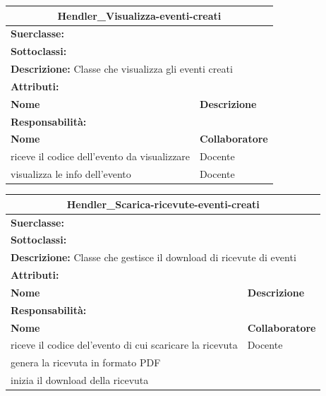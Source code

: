 \documentclass[11pt]{article}
\begin{document}
\begin{table}[H]
\centering
\begin{tabularx}{1\textwidth}{|X|X|}\hline
\multicolumn{2}{|c|}{\textbf{Hendler\_Visualizza-eventi-creati}}\\\hline
\multicolumn{2}{|l|}{\textbf{Suerclasse:}}\\\hline
\multicolumn{2}{|l|}{\textbf{Sottoclassi:}}\\\hline
\multicolumn{2}{|l|}{\textbf{Descrizione:} Classe che visualizza gli eventi creati}\\\hline
\multicolumn{2}{|l|}{\textbf{Attributi:}}\\
\textbf{Nome} & \textbf{Descrizione}\\
\hline
\multicolumn{2}{|l|}{\textbf{Responsabilità:}}\\
\textbf{Nome} & \textbf{Collaboratore}\\
riceve il codice dell'evento da visualizzare & Docente\\
visualizza le info dell'evento & Docente\\
\hline
\end{tabularx}
\end{table}


\begin{table}[H]
\centering
\begin{tabularx}{1\textwidth}{|X|X|}\hline
\multicolumn{2}{|c|}{\textbf{Hendler\_Scarica-ricevute-eventi-creati}}\\\hline
\multicolumn{2}{|l|}{\textbf{Suerclasse:}}\\\hline
\multicolumn{2}{|l|}{\textbf{Sottoclassi:}}\\\hline
\multicolumn{2}{|l|}{\textbf{Descrizione:} Classe che gestisce il download di ricevute di eventi}\\\hline
\multicolumn{2}{|l|}{\textbf{Attributi:}}\\
\textbf{Nome} & \textbf{Descrizione}\\
\hline
\multicolumn{2}{|l|}{\textbf{Responsabilità:}}\\
\textbf{Nome} & \textbf{Collaboratore}\\
riceve il codice del'evento di cui scaricare la ricevuta & Docente\\
genera la ricevuta in formato PDF &\\
inizia il download della ricevuta &\\
\hline
\end{tabularx}
\end{table}
\end{document}
